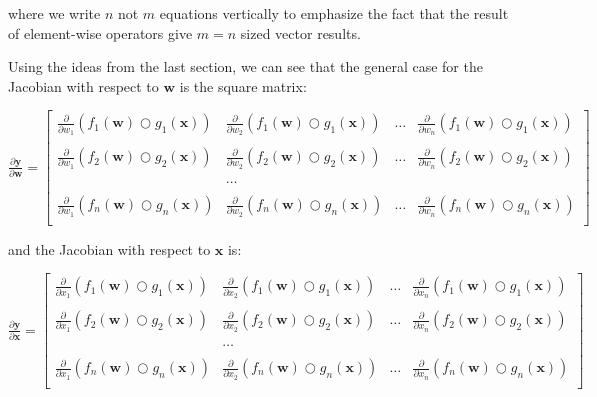 \documentclass[11pt]{article}
\begin{document}
where we write $n$ not $m$ equations vertically to emphasize the fact that the result of element-wise operators give $m=n$ sized vector results.

Using the ideas from the last section, we can see that the general case for the Jacobian with respect to $\mathbf{w}$ is the square matrix:

$
\frac{\partial \mathbf{y}}{\partial \mathbf{w}}  = \begin{bmatrix}
\frac{\partial}{\partial w_1} ( f_{1}(\mathbf{w}) \bigcirc g_{1}(\mathbf{x}) ) & \frac{\partial}{\partial w_2} ( f_{1}(\mathbf{w}) \bigcirc g_{1}(\mathbf{x}) ) & \ldots & \frac{\partial}{\partial w_n} ( f_{1}(\mathbf{w}) \bigcirc g_{1}(\mathbf{x}) )\\\\
\frac{\partial}{\partial w_1} ( f_{2}(\mathbf{w}) \bigcirc g_{2}(\mathbf{x}) ) & \frac{\partial}{\partial w_2} ( f_{2}(\mathbf{w}) \bigcirc g_{2}(\mathbf{x}) ) & \ldots & \frac{\partial}{\partial w_n} ( f_{2}(\mathbf{w}) \bigcirc g_{2}(\mathbf{x}) )\\\\
& \ldots\\\\
\frac{\partial}{\partial w_1} ( f_{n}(\mathbf{w}) \bigcirc g_{n}(\mathbf{x}) ) & \frac{\partial}{\partial w_2} ( f_{n}(\mathbf{w}) \bigcirc g_{n}(\mathbf{x}) ) & \ldots & \frac{\partial}{\partial w_n} ( f_{n}(\mathbf{w}) \bigcirc g_{n}(\mathbf{x}) )\\
\end{bmatrix}
$

and the Jacobian with respect to $\mathbf{x}$ is:

$
\frac{\partial \mathbf{y}}{\partial \mathbf{x}}  = \begin{bmatrix}
\frac{\partial}{\partial x_1} ( f_{1}(\mathbf{w}) \bigcirc g_{1}(\mathbf{x}) ) & \frac{\partial}{\partial x_2} ( f_{1}(\mathbf{w}) \bigcirc g_{1}(\mathbf{x}) ) & \ldots & \frac{\partial}{\partial x_n} ( f_{1}(\mathbf{w}) \bigcirc g_{1}(\mathbf{x}) )\\\\
\frac{\partial}{\partial x_1} ( f_{2}(\mathbf{w}) \bigcirc g_{2}(\mathbf{x}) ) & \frac{\partial}{\partial x_2} ( f_{2}(\mathbf{w}) \bigcirc g_{2}(\mathbf{x}) ) & \ldots & \frac{\partial}{\partial x_n} ( f_{2}(\mathbf{w}) \bigcirc g_{2}(\mathbf{x}) )\\\\
& \ldots\\\\
\frac{\partial}{\partial x_1} ( f_{n}(\mathbf{w}) \bigcirc g_{n}(\mathbf{x}) ) & \frac{\partial}{\partial x_2} ( f_{n}(\mathbf{w}) \bigcirc g_{n}(\mathbf{x}) ) & \ldots & \frac{\partial}{\partial x_n} ( f_{n}(\mathbf{w}) \bigcirc g_{n}(\mathbf{x}) )\\
\end{bmatrix}
$
\end{document}
